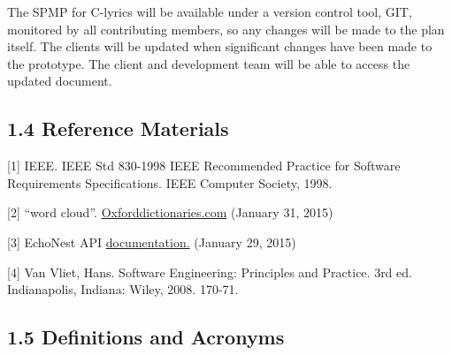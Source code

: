 \documentclass[]{article}
\begin{document}
The SPMP for C-lyrics will be available under a version control tool,
GIT, monitored by all contributing members, so any changes will be made
to the plan itself. The clients will be updated when significant changes
have been made to the prototype. The client and development team will be
able to access the updated document.

\subsection{1.4 Reference Materials}\label{reference-materials}

{[}1{]} IEEE. IEEE Std 830-1998 IEEE Recommended Practice for Software
Requirements Specifications. IEEE Computer Society, 1998.

{[}2{]} ``word cloud''.
\href{http://www.oxforddictionaries.com/us/definition/american_english/word-cloud}{Oxforddictionaries.com}
(January 31, 2015)

{[}3{]} EchoNest API
\href{http://developer.echonest.com/docs/v4/index.html\#overview}{documentation.}
(January 29, 2015)

{[}4{]} Van Vliet, Hans. Software Engineering: Principles and Practice.
3rd ed. Indianapolis, Indiana: Wiley, 2008. 170-71.

\subsection{1.5 Definitions and
Acronyms}\label{definitions-and-acronyms}
\end{document}
